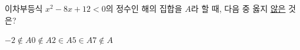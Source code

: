 이차부등식 $x^2-8x+12<0$의 정수인 해의 집합을 $A$라 할 때, 다음 중 옳지 \underline{않은} 것은?
\begin{choices32}{$-2\notin A$}{$0\notin A$}{$2\in A$}{$5\in A$}{$7\notin A$}\end{choices32}
